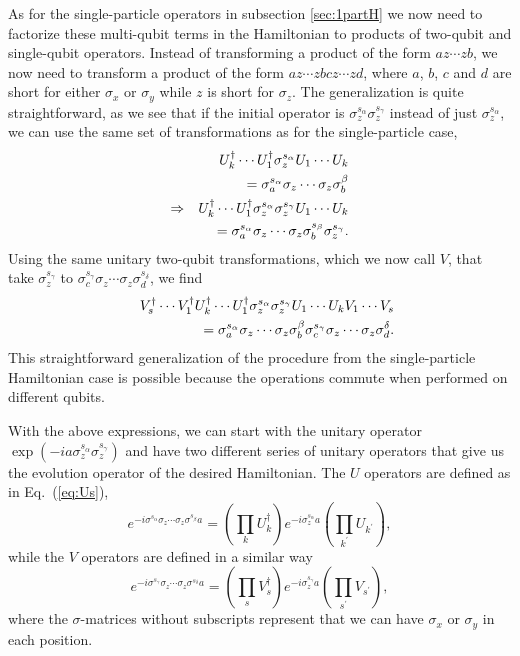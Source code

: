 As for the single-particle operators in subsection \ref{sec:1partH}
we now need to factorize these multi-qubit 
terms in the Hamiltonian to
products of two-qubit and single-qubit operators.
Instead of transforming a product of the form $a z\cdots z b$, we now
need to transform a product of the form $a z\cdots zb cz\cdots zd$,
where $a$, $b$, $c$ and $d$ are short for either $\sigma_x$ or
$\sigma_y$ while $z$ is short for $\sigma_z$.  
The generalization is quite straightforward, as we see that if the
initial operator is $\sigma_z^{s_\alpha} \sigma_z^{s_\gamma}$ instead
of just $\sigma_z^{s_\alpha}$, we can use the same set of
transformations as for the single-particle case,
\begin{eqnarray}
&&U_k^\dag \cdots U_1^\dag \sigma_z^{s_\alpha} U_1 \cdots U_k 
\notag  \\ &&=
\sigma_a^{s_\alpha} 
\sigma_z \cdots \sigma_z \sigma_b^{\beta}
\notag \\
\Rightarrow&&  
U_k^\dag \cdots U_1^\dag \sigma_z^{s_\alpha} \sigma_z^{s_\gamma} 
U_1 \cdots U_k \notag \\
&&= \sigma_a^{s_\alpha}
\sigma_z \cdots \sigma_z \sigma_b^{s_\beta}  \sigma_z^{s_\gamma}.
\end{eqnarray}
Using the same unitary two-qubit transformations, which we now call 
$V$, 
that take $\sigma_z^{s_\gamma}$ to $\sigma_c^{s_\gamma} \sigma_z
\cdots \sigma_z \sigma_d^{s_\delta}$,
we find
\begin{eqnarray}
&&V_s^\dag\cdots V_1^\dag
U_k^\dag \cdots U_1^\dag \sigma_z^{s_\alpha}\sigma_z^{s_\gamma}
 U_1 \cdots U_k 
V_1\cdots V_s \notag \\
&&=
\sigma_a^{s_\alpha} 
\sigma_z \cdots \sigma_z \sigma_b^{\beta} 
\sigma_c^{s_\gamma} 
\sigma_z \cdots \sigma_z \sigma_d^{\delta}.
\end{eqnarray}
This straightforward generalization of the procedure from the single-particle
Hamiltonian case is possible because the operations commute when performed
on different qubits.


With the above expressions, we can start with
the unitary operator $\exp(-ia \sigma_z^{s_\alpha}\sigma_z^{s_\gamma})$
and have two different series of unitary operators that give us the
evolution operator of the desired Hamiltonian. 
The $U$ operators are defined as in 
Eq.~(\ref{eq:Us}),
\begin{equation}
e^{-i\sigma^{s_\alpha} \sigma_z \cdots \sigma_z
\sigma^{s_\beta}a}  
= \left(\prod_k U_k^\dag \right) e^{-i\sigma_z^{s_\alpha}a} 
\left(\prod_{k^\prime}
U_{k^\prime}\right),
\end{equation}
while the 
$V$ operators are defined in a similar way
\begin{equation}
e^{-i\sigma^{s_\gamma} \sigma_z \cdots \sigma_z
\sigma^{s_\delta}a}  
= \left(\prod_s V_s^\dag \right) e^{-i\sigma_z^{s_\gamma}a} 
\left(\prod_{s^\prime}
V_{s^\prime}\right),
\end{equation}
where the $\sigma$-matrices without subscripts represent that we can
have $\sigma_x$ or $\sigma_y$ in each position.

